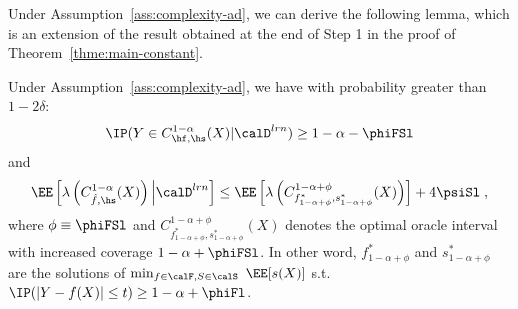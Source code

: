 Under Assumption~\ref{ass:complexity-ad}, we can derive the following lemma, which is an extension of the result obtained at the end of Step 1 in the proof of Theorem~\ref{thme:main-constant}.

\begin{lemma}
    \label{lem:scott-adap}
    Under Assumption~\ref{ass:complexity-ad}, we have with probability greater than $1-2\delta$:    
    \begin{equation}
        \label{eq:lower-scott-app-AD}
        \IP(Y\in C_{\hf,\hs}^{1-\alpha}(X)|\calD^{lrn})\geq 1-\alpha - \phiFSl
    \end{equation}
    and
    \begin{equation}
        \label{eq:lower-scott-app2-AD}
        \EE\left[\lambda\left(C_{\hat{f},\hs}^{1-\alpha}(X)\right)\Big|\calD^{lrn}\right] \leq \EE\left[\lambda\left(C_{f_{1-\alpha+\phi}^*,s_{1-\alpha+\phi}^*}^{1-\alpha + \phi}(X)\right)\right] + 4\psiSl\;,
    \end{equation}
    where $\phi \equiv \phiFSl$ and $C_{f_{1-\alpha+\phi}^*,s_{1-\alpha+\phi}^*}^{1-\alpha + \phi}(X)$ denotes the optimal oracle interval with increased coverage $1-\alpha + \phiFSl$. In other word, $f_{1-\alpha+\phi}^*$ and $s_{1-\alpha+\phi}^*$ are the solutions of $\min_{f\in\calF, S\in \calS}~ \EE[s(X)]$ s.t. $\IP(|Y-f(X)|\leq t)\geq 1-\alpha + \phiFl$.
\end{lemma}

